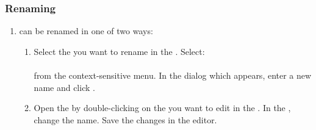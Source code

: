 \subsubsection{Renaming \gdjob{}}
\label{TasksRenameJob}
\begin{enumerate}
\item \gdjobs{} can be renamed in one of two ways:
\begin{enumerate}
\item Select the \gdjob{} you want to rename in the \gdtestsuitebrowser{}. Select:\\
\\
from the context-sensitive menu. In the dialog which appears, enter a new name and click . 
\item Open the \gdjobeditor{} by double-clicking on the \gdjob{} you want to edit in the \gdtestsuitebrowser{}.  In the \gdpropview{}, change the \gdjob{} name. Save the changes in the editor.  
\end{enumerate}
\end{enumerate}
